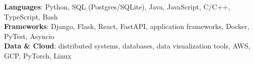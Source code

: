 \begin{itemize}[leftmargin=0.15in, label={}]
    \small{\item{
     \textbf{Languages}{: Python, SQL (Postgres/SQLite), Java, JavaScript, C/C++, TypeScript, Bash} \\
     \textbf{Frameworks}{: Django, Flask, React, FastAPI, application frameworks, Docker, PyTest, Asyncio} \\
     \textbf{Data \& Cloud}{: distributed systems, databases, data visualization tools, AWS, GCP, PyTorch, Linux}
    }}
\end{itemize}
